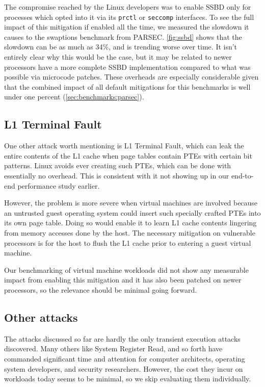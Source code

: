 The compromise reached by the Linux developers was to enable SSBD only for processes which opted into it via its \texttt{prctl} or \texttt{seccomp} interfaces.
To see the full impact of this mitigation if enabled all the time, we measured the slowdown it causes to the swaptions benchmark from PARSEC.
\autoref{fig:ssbd} shows that the slowdown can be as much as 34\%,
and is trending worse over time.
It isn't entirely clear why this would be the case, but it may be related to newer processors have a more complete SSBD implementation compared to what was possible via microcode patches.
These overheads are especially considerable given that the combined
impact of all default mitigations for this benchmarks is well under one percent (\autoref{sec:benchmarks:parsec}).

\subsection{L1 Terminal Fault}
One other attack worth mentioning is L1 Terminal Fault, which can leak the entire contents of the L1 cache when page tables contain PTEs with certain bit patterns.
Linux avoids ever creating such PTEs, which can be done with essentially no overhead.
This is consistent with it not showing up in our end-to-end performance study earlier.

However, the problem is more severe when virtual machines are involved because an untrusted guest operating system could insert such specially crafted PTEs into its own page table.
Doing so would enable it to learn L1 cache contents lingering from memory accesses done by the host.
The necessary mitigation on vulnerable processors is for the host to flush the L1 cache prior to entering a guest virtual machine.

Our benchmarking of virtual machine workloads did not show any measurable impact from enabling this mitigation and it has also been patched on newer processors, so the relevance should be minimal going forward.

\subsection{Other attacks}

The attacks discussed so far are hardly the only transient execution attacks discovered.
Many others like System Register Read, and so forth have commanded significant time and attention for computer architects, operating system developers, and security researchers.
However, the cost they incur on workloads today seems to be minimal, so we skip evaluating them individually.
